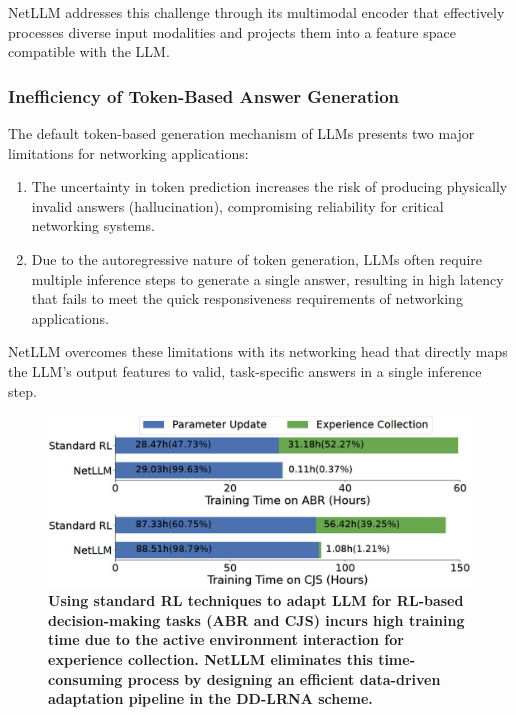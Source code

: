 \documentclass[twocolumn]{article}
\begin{document}

NetLLM addresses this challenge through its multimodal encoder that effectively processes diverse input modalities and projects them into a feature space compatible with the LLM.

\subsubsection{Inefficiency of Token-Based Answer Generation}
The default token-based generation mechanism of LLMs presents two major limitations for networking applications:

\begin{enumerate}[itemsep=0pt, topsep=2pt, parsep=0pt]
  \item The uncertainty in token prediction increases the risk of producing physically invalid answers (hallucination), compromising reliability for critical networking systems.
  \item Due to the autoregressive nature of token generation, LLMs often require multiple inference steps to generate a single answer, resulting in high latency that fails to meet the quick responsiveness requirements of networking applications.
\end{enumerate}


NetLLM overcomes these limitations with its networking head that directly maps the LLM's output features to valid, task-specific answers in a single inference step.

\begin{figure}[t]
  \centering
  \includegraphics[width=1\linewidth]{img/figure3.jpg}
  \caption{\textbf{Using standard RL techniques to adapt LLM for RL-based decision-making tasks (ABR and CJS) incurs high training time due to the active environment interaction for experience collection. NetLLM eliminates this time-consuming process by designing an efficient data-driven adaptation pipeline in the DD-LRNA scheme.}}
  \label{fig:3}
\end{figure}
\end{document}
